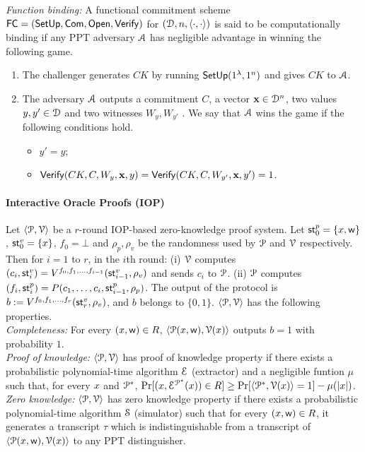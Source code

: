 {\it Function binding: } A functional commitment scheme $\mathsf{FC} = (\mathsf{SetUp}, \mathsf{Com}, \mathsf{Open}, \mathsf{Verify})$ for $(\mathcal{D}, n,\langle \cdot,\cdot\rangle)$ is said to be computationally binding if any PPT adversary $\mathcal{A}$ has negligible advantage in winning the following game.
\begin{enumerate}
	\item The challenger generates $CK$ by running $\mathsf{SetUp}(1^{\lambda}, 1^n)$ and gives $CK$ to $\mathcal{A}$.
	\item The adversary $\mathcal{A}$ outputs a commitment $C$, a vector ${\bf x} \in \mathcal{D}^n$, two values $y, y' \in \mathcal{D}$ and two witnesses $W_y, W_{y'}$ . We say that $\mathcal{A}$ wins the game if the following conditions hold.
	\begin{itemize}
		\item $y' = y$;
		\item $\mathsf{Verify}(CK, C, W_y, {\bf x}, y) = \mathsf{Verify}(CK, C, W_{y'} , {\bf x}, y') = 1$.
	\end{itemize}
\end{enumerate}


\paragraph*{Interactive Oracle Proofs (IOP)} Let $\langle \mathcal{P},\mathcal{V}\rangle$ be a $r$-round IOP-based zero-knowledge proof system. Let $\mathsf{st}^p_0 = \{{x}, \mathsf{w}\}$, $\mathsf{st}^v_0 = \{{x}\}$, $f_0 = \bot$ and $\rho_p, \rho_v$ be the randomness used by $\mathcal{P}$ and $\mathcal{V}$ respectively.
Then for $i = 1$ to $r$, in the $i$th round: (i) $\mathcal{V}$ computes $(c_i,\mathsf{st}^v_i) = V^{f_0, f_1, \ldots, f_{i-1}}(\mathsf{st}^v_{i-1}, \rho_v)$ and sends $c_i$ to $\mathcal{P}$. 
(ii) $\mathcal{P}$ computes $(f_i, \mathsf{st}^p_i) = P(c_1, \ldots, c_i, \mathsf{st}^p_{i-1}, \rho_p)$.
The output of the protocol is $b := V^{f_0, f_1, \ldots, f_{r}}(\mathsf{st}^v_{r}, \rho_v)$, and $b$ belongs to $\{0,1\}$. $\langle \mathcal{P},\mathcal{V}\rangle$ has the following properties.\\
{\em Completeness:} For every $({x}, \mathsf{w}) \in R$, $\langle \mathcal{P}({x}, \mathsf{w}),\mathcal{V}({x})\rangle$ outputs $b = 1$ with probability $1$.\\
{\em Proof of knowledge:} $\langle \mathcal{P},\mathcal{V}\rangle$ has proof of knowledge property if there exists a probabilistic polynomial-time algorithm $\mathcal{E}$ (extractor) and a negligible funtion $\mu$ such that, for every ${x}$ and $\mathcal{P}^\ast$, $\Pr[({x}, \mathcal{E}^{\mathcal{P}^\ast}({x})) \in R] \geq \Pr[\langle \mathcal{P}^\ast,\mathcal{V}({x})\rangle = 1] - \mu(|{x}|)$.\\
{\em Zero knowledge:} $\langle \mathcal{P},\mathcal{V}\rangle$ has zero knowledge property if there exists a probabilistic polynomial-time algorithm $\mathcal{S}$ (simulator) such that for every $({x}, \mathsf{w}) \in R$, it generates a transcript $\tau$ which is indistinguishable from a transcript of $\langle \mathcal{P}({x}, \mathsf{w}),\mathcal{V}({x})\rangle$ to any PPT distinguisher.


